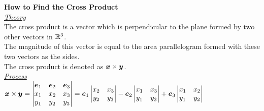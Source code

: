 \documentclass[11pt,a4paper]{article}
\begin{document}
\textbf{How to Find the Cross Product}\\

\underline{\textit{Theory}}\\
The cross product is a vector which is perpendicular to the plane formed by two other vectors in $\mathbb{R}^3$.\\
The magnitude of this vector is equal to the area parallelogram formed with these two vectors as the sides.\\
The cross product is denoted as $\boldsymbol{x} \times \boldsymbol{y}$.\\

\underline{\textit{Process}}\\
$\boldsymbol{x} \times \boldsymbol{y} = \begin{vmatrix} \boldsymbol{e}_1 & \boldsymbol{e}_2 & \boldsymbol{e}_3 \\ x_1 & x_2 & x_3 \\ y_1 & y_2 & y_3 \end{vmatrix} = \boldsymbol{e}_1\begin{vmatrix} x_2 & x_3 \\ y_2 & y_3 \end{vmatrix} - \boldsymbol{e}_2\begin{vmatrix} x_1 & x_3 \\ y_1 & y_3 \end{vmatrix} + \boldsymbol{e}_3\begin{vmatrix} x_1 & x_2 \\ y_1 & y_2 \end{vmatrix}$\\
\end{document}

